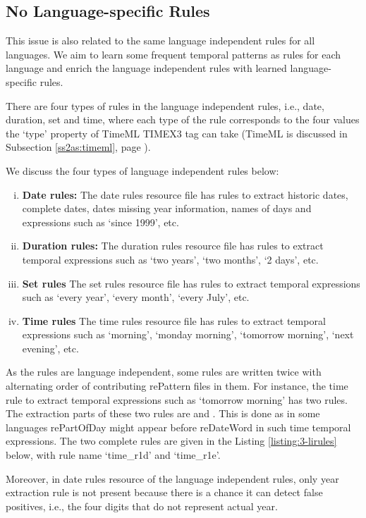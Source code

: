 \subsection{No Language-specific Rules}
This issue is also related to the same language independent rules for all languages. We aim to learn some frequent temporal patterns as rules for each language and enrich the language independent rules with learned language-specific rules.

There are four types of rules in the language independent rules, i.e., date, duration, set and time, where each type of the rule corresponds to the four values the `type' property of TimeML TIMEX3 tag can take (TimeML is discussed in Subsection \ref{ss2as:timeml}, page \pageref{ss2as:timeml}).

We discuss the four types of language independent rules below:
\begin{enumerate}[i.]
	\item \textbf{Date rules:} The date rules resource file has rules to extract historic dates, complete dates, dates missing year information, names of days and expressions such as `since 1999', etc.
	\item \textbf{Duration rules:} The duration rules resource file has rules to extract temporal expressions such as `two years', `two months', `2 days', etc.  
	\item \textbf{Set rules} The set rules resource file has rules to extract temporal expressions such as `every year', `every month', `every July', etc.
	\item \textbf{Time rules} The time rules resource file has rules to extract temporal expressions such as `morning', `monday morning', `tomorrow morning', `next evening', etc.
\end{enumerate}

As the rules are language independent, some rules are written twice with alternating order of contributing rePattern files in them. For instance, the time rule to extract temporal expressions such as `tomorrow morning' has two rules. The extraction parts of these two rules are  and . This is done as in some languages rePartOfDay might appear before reDateWord in such time temporal expressions. The two complete rules are given in the Listing \ref{listing:3-lirules} below, with rule name `time\_r1d' and `time\_r1e'.

Moreover, in date rules resource of the language independent rules, only year extraction rule is not present because there is a chance it can detect false positives, i.e., the four digits that do not represent actual year.

